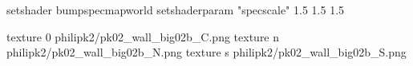setshader bumpspecmapworld
setshaderparam "specscale" 1.5 1.5 1.5

texture 0 philipk2/pk02_wall_big02b_C.png
texture n philipk2/pk02_wall_big02b_N.png
texture s philipk2/pk02_wall_big02b_S.png

